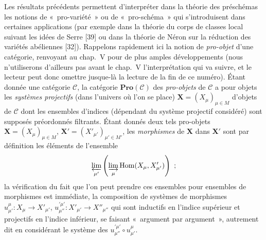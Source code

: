 \begin{env}[8.13.3]
\label{IV.8.13.3-fr}
Les résultats précédents permettent d'interpréter dans la théorie des
préschémas les notions de «~pro-variété~» ou de «~pro-schéma~» qui
s'introduisent dans certaines applications (par exemple dans la théorie du
corps de classes local suivant les idées de Serre [39] ou dans la théorie de
Néron sur la réduction des variétés
abéliennes [32]). Rappelons rapidement ici la notion de \emph{pro-objet} d'une
catégorie, renvoyant au chap.~V pour de plus amples développements (nous
n'utiliserons d'ailleurs pas avant le chap.~V l'interprétation qui va suivre,
et le lecteur peut donc omettre jusque-là la lecture de la fin de ce numéro).
Étant donnée une catégorie $\mathcal C$, la catégorie
$\mathbf{Pro}(\mathcal C)$ des \emph{pro-objets} de $\mathcal C$ a pour objets
les \emph{systèmes projectifs} (dans l'univers où l'on se place)
$\mathbf X=(X_\mu)_{\mu\in M}$ d'objets de $\mathcal C$ dont les ensembles
d'indices (dépendant du système projectif considéré) sont supposés préordonnés
filtrants. Étant donnés deux tels pro-objets
$\mathbf X=(X_\mu)_{\mu\in M}$,
$\mathbf X'=(X'_{\mu'})_{\mu'\in M'}$, les \emph{morphismes} de $\mathbf X$
dans $\mathbf X'$ sont par définition les éléments de l'ensemble
\[
\varprojlim_{\mu'}\left(\varinjlim_\mu
\operatorname{Hom}(X_\mu,X'_{\mu'})\right)~;
\]
la vérification du fait que l'on peut prendre ces ensembles pour ensembles de
morphismes est immédiate, la composition de systèmes de morphismes
$u_{\mu'}^\mu:X_\mu\to X'_{\mu'}$,
$u_{\mu''}^{\prime\mu'}:X'_{\mu'}\to X''_{\mu''}$ qui sont inductifs en
l'indice supérieur et projectifs en l'indice inférieur, se faisant
«~argument par argument~», autrement dit en considérant le système des
$u_{\mu''}^{\prime\mu'}\circ u_{\mu'}^\mu$.
\end{env}


